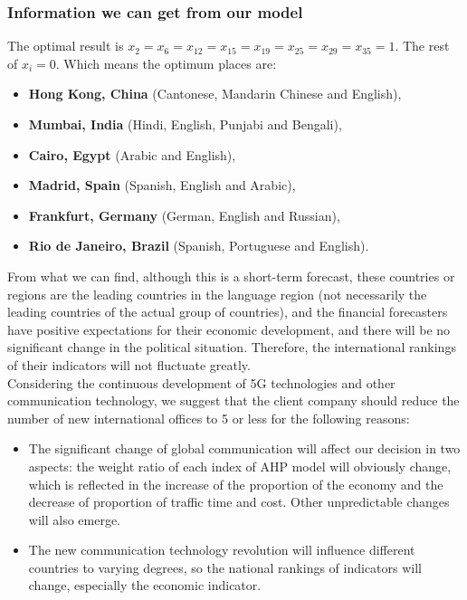 \documentclass{mcmthesis}
\begin{document}
\subsubsection{Information we can get from our model}
\hspace*{8mm}The optimal result is $x_2=x_6=x_{12}=x_{15}=x_{19}=x_{25}=x_{29}=x_{35}=1$. The rest of $x_i=0$. Which means the optimum places are:
\begin{itemize}
\item \textbf{Hong Kong, China} (Cantonese, Mandarin Chinese and English), 
\item \textbf{Mumbai, India} (Hindi, English, Punjabi and Bengali), 
\item \textbf{Cairo, Egypt} (Arabic and English), 
\item \textbf{Madrid, Spain} (Spanish, English and Arabic), 
\item \textbf{Frankfurt, Germany} (German, English and Russian), 
\item \textbf{Rio de Janeiro, Brazil} (Spanish, Portuguese and English).
\end{itemize}
\hspace*{8mm}From what we can find, although this is a short-term forecast, these countries or regions are the leading countries in the language region (not necessarily the leading countries of the actual group of countries), and the financial forecasters have positive expectations for their economic development, and there will be no significant change in the political situation. Therefore, the international rankings of their indicators will not fluctuate greatly.\\
\hspace*{8mm}Considering the continuous development of 5G technologies and other communication technology, we suggest that the client company should reduce the number of new international offices to 5 or less for the following reasons:
\begin{itemize}
\item The significant change of global communication will affect our decision in two aspects: the weight ratio of each index of AHP model will obviously change, which is reflected in the increase of the proportion of the economy and the decrease of proportion of traffic time and cost. Other unpredictable changes will also emerge.
\item The new communication technology revolution will influence different countries to varying degrees, so the national rankings of indicators will change, especially the economic indicator. 
\end{itemize}
\end{document}
